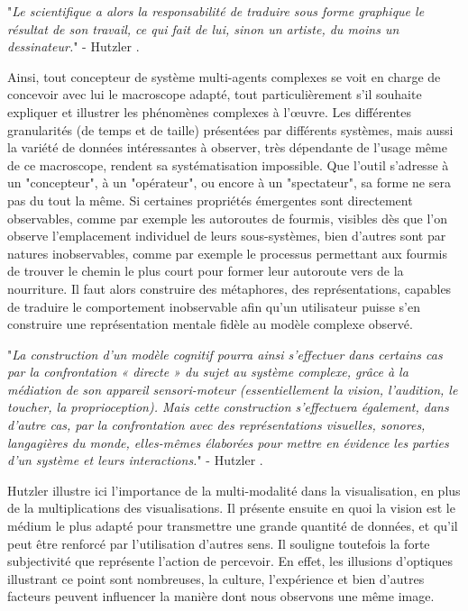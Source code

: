 		"\textit{Le scientifique a alors la responsabilité de traduire sous forme graphique le résultat de son travail, ce qui fait de lui, sinon un artiste, du moins un dessinateur.}" - Hutzler \cite{hutzler_du_2000}.

	Ainsi, tout concepteur de système multi-agents complexes se voit en charge de concevoir avec lui le macroscope adapté, tout particulièrement s'il souhaite expliquer et illustrer les phénomènes complexes à l'œuvre. Les différentes granularités (de temps et de taille) présentées par différents systèmes, mais aussi la variété de données intéressantes à observer, très dépendante de l'usage même de ce macroscope, rendent sa systématisation impossible. Que l'outil s'adresse à un "concepteur", à un "opérateur", ou encore à un "spectateur", sa forme ne sera pas du tout la même. 
	Si certaines propriétés émergentes sont directement observables, comme par exemple les autoroutes de fourmis, visibles dès que l'on observe l'emplacement individuel de leurs sous-systèmes, bien d'autres sont par natures inobservables, comme par exemple le processus permettant aux fourmis de trouver le chemin le plus court pour former leur autoroute vers de la nourriture. Il faut alors construire des métaphores, des représentations, capables de traduire le comportement inobservable afin qu'un utilisateur puisse s'en construire une représentation mentale fidèle au modèle complexe observé.

		"\textit{La construction d'un modèle cognitif pourra ainsi s'effectuer dans certains cas par la confrontation « directe » du sujet au système complexe, grâce à la médiation de son appareil sensori-moteur (essentiellement la vision, l'audition, le toucher, la proprioception). Mais cette construction s'effectuera également, dans d'autre cas, par la confrontation avec des représentations visuelles, sonores, langagières du monde, elles-mêmes élaborées pour mettre en évidence les parties d'un système et leurs interactions.}" - Hutzler \cite{hutzler_du_2000}.
		
		Hutzler illustre ici l'importance de la multi-modalité dans la visualisation, en plus de la multiplications des visualisations. Il présente ensuite en quoi la vision est le médium le plus adapté pour transmettre une grande quantité de données, et qu'il peut être renforcé par l'utilisation d'autres sens. Il souligne toutefois la forte subjectivité que représente l'action de percevoir. En effet, les illusions d'optiques illustrant ce point sont nombreuses, la culture, l'expérience et bien d'autres facteurs peuvent influencer la manière dont nous observons une même image.
		
